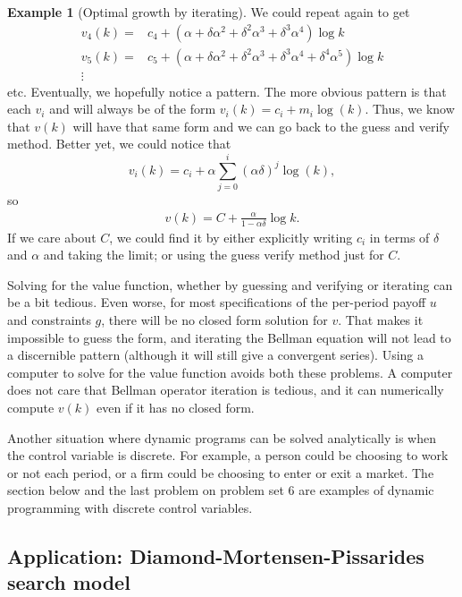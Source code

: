 \documentclass[12pt,reqno]{amsart}
\theoremstyle{definition}
\newtheorem{example}{Example}[section]
\begin{document}
\begin{example}[Optimal growth by iterating]
  We could repeat again to get 
  \begin{align*}
    v_4(k) = & c_4 + (\alpha + \delta \alpha^2 + \delta^2 \alpha^3 +
    \delta^3 \alpha^4) \log k \\
    v_5(k) = & c_5 + (\alpha + \delta \alpha^2 + \delta^2 \alpha^3 +
    \delta^3 \alpha^4 + \delta^4 \alpha^5) \log k \\
    \vdots
  \end{align*}
  etc. Eventually, we hopefully notice a pattern. The more obvious
  pattern is that each $v_i$ and will always be of the form $v_i(k) =
  c_i + m_i \log(k)$. Thus, we know that $v(k)$ will have that same
  form and we can go back to the guess and verify method. Better yet,
  we could notice that
  \[ v_i(k) = c_i + \alpha \sum_{j = 0}^i (\alpha \delta)^j \log(k),\]
  so 
  \begin{align*}
    v(k) = C + \frac{\alpha}{1-\alpha \delta} \log k.
  \end{align*}
  If we care about $C$, we could find it by either explicitly writing
  $c_i$ in terms of $\delta$ and $\alpha$ and taking the limit; or
  using the guess verify method just for $C$. 
\end{example}

Solving for the value function, whether by guessing and verifying or
iterating can be a bit tedious. Even worse, for most specifications of
the per-period payoff $u$ and constraints $g$, there will be no closed
form solution for $v$. That makes it impossible to guess the form, and
iterating the Bellman equation will not lead to a discernible pattern
(although it will still give a convergent series). Using a computer to
solve for the value function avoids both these problems. A computer
does not care that Bellman operator iteration is tedious, and it can
numerically compute $v(k)$ even if it has no closed form. 

Another situation where dynamic programs can be solved analytically is
when the control variable is discrete. For example, a person could be
choosing to work or not each period, or a firm could be choosing to
enter or exit a market. The section below and the last problem on
problem set 6 are examples of dynamic programming with discrete
control variables. 

\subsection{Application: Diamond-Mortensen-Pissarides search model}
\end{document}
